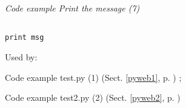 \label{pyweb7}
    \begin{flushleft}
    \textit{Code example Print the message (7)}
    \begin{Verbatim}[commandchars=\\\{\},codes={\catcode`$=3\catcode`^=7},frame=single]

print msg

    \end{Verbatim}
    
    \footnotesize
    Used by:
    \begin{list}{}{}
    
    \item Code example test.py (1) (Sect. \ref{pyweb1}, p. \pageref{pyweb1})
; 
    \item Code example test2.py (2) (Sect. \ref{pyweb2}, p. \pageref{pyweb2})

    \end{list}
    \normalsize
    
    \end{flushleft}


